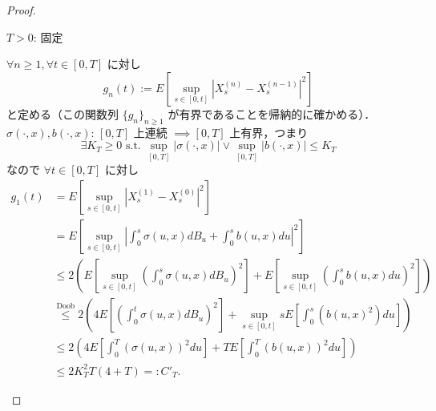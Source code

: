 \documentclass{jsarticle}
\begin{document}
\begin{proof}
\begin{enumerate}[label=(\roman*)]
        $T>0$: 固定

        $\forall n\ge1, \forall t\in[0, T]$ に対し
        $$
        g_n(t)
        := E[\sup_{s\in[0, t]}\left\lvert X_s^{(n)}-X_s^{(n-1)}\right\rvert^2]
        $$
        と定める（この関数列 $\{g_n\}_{n\ge1}$ が有界であることを帰納的に確かめる）．
        $\sigma(\cdot, x), b(\cdot, x)$: $[0, T]$ 上連続 $\implies [0, T]$ 上有界，つまり
        $$
        \exists K_T\ge0\text{ s.t. }\sup_{[0, T]}\left\lvert \sigma(\cdot, x)\right\rvert\vee\sup_{[0, T]}\left\lvert b(\cdot, x)\right\rvert\le K_T
        $$
        なので $\forall t\in[0, T]$ に対し
        \begin{align}
            g_1(t)
            &= E[\sup_{s\in[0, t]}\left\lvert X_s^{(1)}-X_s^{(0)}\right\rvert^2] \\
            &= E[\sup_{s\in[0, t]}\left\lvert \int_0^s \sigma(u, x)dB_u
            + \int_0^s b(u, x)du\right\rvert^2] \\
            &\le 2(E[\sup_{s\in[0, t]}(\int_0^s \sigma(u, x)dB_u)^2]
            + E[\sup_{s\in[0, t]}(\int_0^s b(u, x)du)^2]) \\
            &\stackrel{\text{Doob}}{\le} 2(4E[(\int_0^t \sigma(u, x)dB_u)^2]
            + \sup_{s\in[0, t]}sE[\int_0^s (b(u, x)^2)du]) \\
            &\le 2(4E[\int_0^T (\sigma(u, x))^2du]
            + TE[\int_0^T (b(u, x))^2du]) \\
            &\le 2K_T^2T(4+T)=:C'_T.
        \end{align}


\end{enumerate}
\end{proof}
\end{document}
